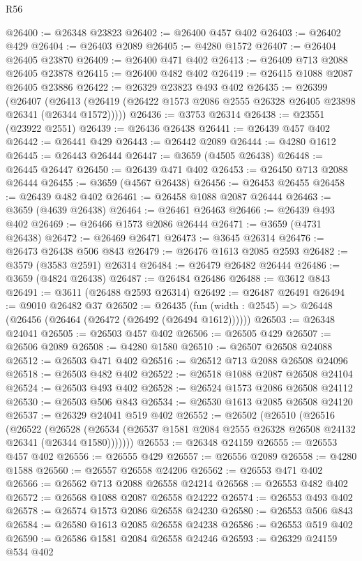 \begin{lexlean}{R56}
\begin{coremodule}
@26400 := @26348 @23823
@26402 := @26400 @457 @402
@26403 := @26402 @429
@26404 := @26403 @2089
@26405 := @4280 @1572
@26407 := @26404 @26405 @23870
@26409 := @26400 @471 @402
@26413 := @26409 @713 @2088 @26405 @23878
@26415 := @26400 @482 @402
@26419 := @26415 @1088 @2087 @26405 @23886
@26422 := @26329 @23823 @493 @402
@26435 := @26399
    (@26407 (@26413 (@26419 (@26422 @1573 @2086 @2555 @26328 @26405 @23898 @26341 (@26344 @1572)))))
@26436 := @3753 @26314
@26438 := @23551 (@23922 @2551)
@26439 := @26436 @26438
@26441 := @26439 @457 @402
@26442 := @26441 @429
@26443 := @26442 @2089
@26444 := @4280 @1612
@26445 := @26443 @26444
@26447 := @3659 (@4505 @26438)
@26448 := @26445 @26447
@26450 := @26439 @471 @402
@26453 := @26450 @713 @2088 @26444
@26455 := @3659 (@4567 @26438)
@26456 := @26453 @26455
@26458 := @26439 @482 @402
@26461 := @26458 @1088 @2087 @26444
@26463 := @3659 (@4639 @26438)
@26464 := @26461 @26463
@26466 := @26439 @493 @402
@26469 := @26466 @1573 @2086 @26444
@26471 := @3659 (@4731 @26438)
@26472 := @26469 @26471
@26473 := @3645 @26314
@26476 := @26473 @26438 @506 @843
@26479 := @26476 @1613 @2085 @2593
@26482 := @3579 (@3583 @2591) @26314
@26484 := @26479 @26482 @26444
@26486 := @3659 (@4824 @26438)
@26487 := @26484 @26486
@26488 := @3612 @843
@26491 := @3611 (@26488 @2593 @26314)
@26492 := @26487 @26491
@26494 := @9010 @26482 @37
@26502 := @26435 (fun (width : @2545) => @26448 (@26456 (@26464 (@26472 (@26492 (@26494 @1612))))))
@26503 := @26348 @24041
@26505 := @26503 @457 @402
@26506 := @26505 @429
@26507 := @26506 @2089
@26508 := @4280 @1580
@26510 := @26507 @26508 @24088
@26512 := @26503 @471 @402
@26516 := @26512 @713 @2088 @26508 @24096
@26518 := @26503 @482 @402
@26522 := @26518 @1088 @2087 @26508 @24104
@26524 := @26503 @493 @402
@26528 := @26524 @1573 @2086 @26508 @24112
@26530 := @26503 @506 @843
@26534 := @26530 @1613 @2085 @26508 @24120
@26537 := @26329 @24041 @519 @402
@26552 := @26502
    (@26510
      (@26516
        (@26522
          (@26528 (@26534 (@26537 @1581 @2084 @2555 @26328 @26508 @24132 @26341 (@26344 @1580)))))))
@26553 := @26348 @24159
@26555 := @26553 @457 @402
@26556 := @26555 @429
@26557 := @26556 @2089
@26558 := @4280 @1588
@26560 := @26557 @26558 @24206
@26562 := @26553 @471 @402
@26566 := @26562 @713 @2088 @26558 @24214
@26568 := @26553 @482 @402
@26572 := @26568 @1088 @2087 @26558 @24222
@26574 := @26553 @493 @402
@26578 := @26574 @1573 @2086 @26558 @24230
@26580 := @26553 @506 @843
@26584 := @26580 @1613 @2085 @26558 @24238
@26586 := @26553 @519 @402
@26590 := @26586 @1581 @2084 @26558 @24246
@26593 := @26329 @24159 @534 @402

\end{coremodule}
\end{lexlean}
